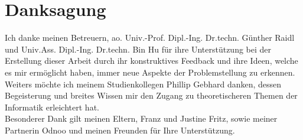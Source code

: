 \chapter*{Danksagung}

Ich danke meinen Betreuern, ao. Univ.-Prof. Dipl.-Ing. Dr.techn. Günther Raidl und Univ.Ass. Dipl.-Ing. Dr.techn. Bin Hu für ihre Unterstützung bei der Erstellung dieser Arbeit durch ihr konstruktives Feedback und ihre Ideen, welche es mir ermöglicht haben, immer neue Aspekte der Problemstellung zu erkennen. Weiters möchte ich meinem Studienkollegen Phillip Gebhard danken, dessen Begeisterung und breites Wissen mir den Zugang zu theoretischeren Themen der Informatik erleichtert hat.\\

Besonderer Dank gilt meinen Eltern, Franz und Justine Fritz, sowie meiner Partnerin Odnoo und meinen Freunden für Ihre Unterstützung.